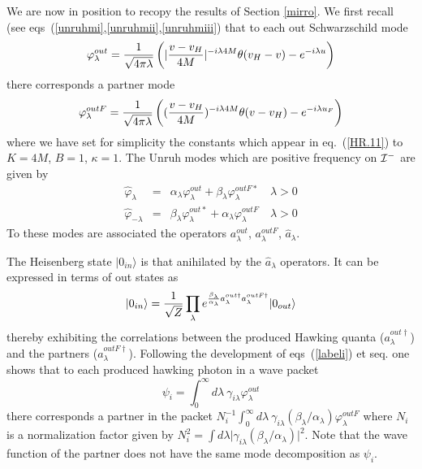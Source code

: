 \documentclass[12pt,oneside]{report}
\def\ket#1{|#1\rangle}
\def\la{\lambda}
\def\beq {\begin{equation}}
\def\feq {\end{equation}}
\begin{document}
We are now in position to recopy the results of Section \ref{mirro}.
We first recall (see eqs~(\ref{unruhmi},\ref{unruhmii},\ref{unruhmiii}) that to each out
Schwarzschild mode
\begin{equation}
\varphi_\la^{out} = {1\over \sqrt{4 \pi \la}}\left(
\vert {v - v_H\over 4M}\vert^{-i\la 4M}\theta(v_H-v) - e^{-i\la u} \right)
\label{modeI}
\end{equation}
there corresponds a partner mode
\begin{equation}
\varphi_\la^{out F} = {1\over \sqrt{4 \pi \la}}\left(
( {v-v_H\over 4M})^{-i\la 4M}\theta(v-v_H) - e^{-i\la u_F} \right)
\label{modeII}
\end{equation}
where we have set for simplicity the constants which 
appear in eq.~(\ref{HR.11}) to  $K=4M$,
$B=1$, $\kappa=1$. The Unruh modes which are positive frequency on ${\cal I}^-$ are given by
\begin{eqnarray}
\hat \varphi_\la &=& \alpha_\la \varphi_\la^{out} 
+ \beta_\la \varphi_\la^{out F *} \quad \la>0 \nonumber\\
\hat \varphi_{-\la} &=& \beta_\la \varphi_\la^{out *} 
+ \alpha_\la \varphi_\la^{out F }\quad \la>0 \label{unruhmiiB}
\end{eqnarray}
To these modes are  associated the operators $a_\la^{out}$, $a_\la^{out F}$,
$\hat a_\la$. 

The Heisenberg state $\ket{0_{in}}$ is that anihilated by the $\hat a_\la$ operators. It can
be expressed in terms of  out states as
\begin{equation}
\ket{0_{in}} = {1 \over \sqrt{Z}} \prod_\la e^{{\beta_\la \over \alpha_\la}
a_\la^{out \dagger} a_\la^{out F\dagger}}\ket{0_{out}}
\label{wi}
\end{equation}
thereby exhibiting the correlations between the produced Hawking quanta
($a_\la^{out \dagger}$) and the partners ($a_\la^{out F\dagger}$). Following the
development of eqs~(\ref{labeli}) et seq.  one shows that  to each
produced hawking photon in a wave packet 
\beq \psi_i =
\int_0^\infty\! d\la\ \gamma_{i\la}
\varphi_\la^{out}\label{wiB}\feq 
there corresponds  a partner in the packet $
N_i^{-1}  \int_0^\infty\! d\la\ \gamma_{i\la}
\left({\beta_\la/\alpha_\la}\right) \varphi_\la^{out F}$ where $N_i$ is a normalization
factor given by $N_i^2= \int d\la\vert \gamma_{i\la}
({\beta_\la/\alpha_\la}) \vert^2$. Note that the wave function of the
partner does not have the same mode decomposition as $\psi_i$.
\end{document}
